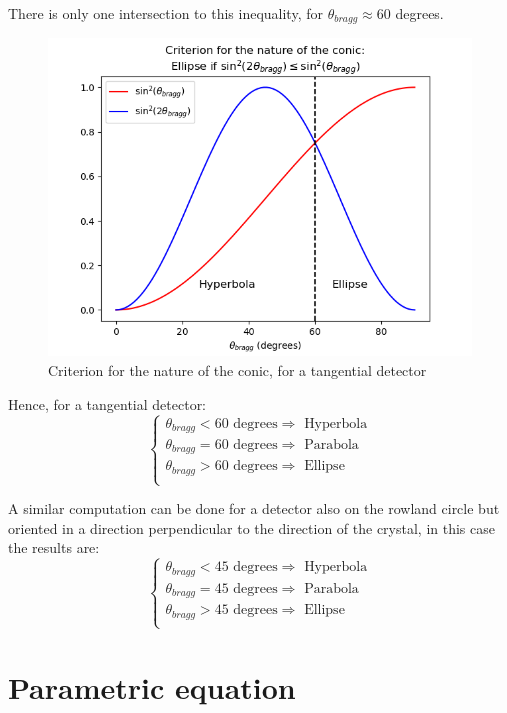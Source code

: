 \documentclass[a4paper,11pt,twoside,titlepage,openright]{book}
\numberwithin{equation}{section}
\newcommand{\lt}{\left}
\newcommand{\rt}{\right}
\begin{document}
There is only one intersection to this inequality, for $\theta_{bragg} \approx
60$ degrees.

\begin{figure}
\begin{center}
    \includegraphics[width=0.6\linewidth]{Criterion_EllipseHyperbola.png}
    \caption{Criterion for the nature of the conic, for a tangential detector}
    \label{fig:boat1}
\end{center}
\end{figure}

Hence, for a tangential detector:
$$
\lt\{
	\begin{array}{lll}
        \theta_{bragg} < 60 \text{ degrees} \Rightarrow \text{ Hyperbola}\\
        \theta_{bragg} = 60 \text{ degrees} \Rightarrow \text{ Parabola}\\
        \theta_{bragg} > 60 \text{ degrees} \Rightarrow \text{ Ellipse}\\
	\end{array}
\rt.
$$

A similar computation can be done for a detector also on the rowland circle but
oriented in a direction perpendicular to the direction of the crystal, in this
case the results are:
$$
\lt\{
	\begin{array}{lll}
        \theta_{bragg} < 45 \text{ degrees} \Rightarrow \text{ Hyperbola}\\
        \theta_{bragg} = 45 \text{ degrees} \Rightarrow \text{ Parabola}\\
        \theta_{bragg} > 45 \text{ degrees} \Rightarrow \text{ Ellipse}\\
	\end{array}
\rt.
$$

\section{Parametric equation}
\end{document}
